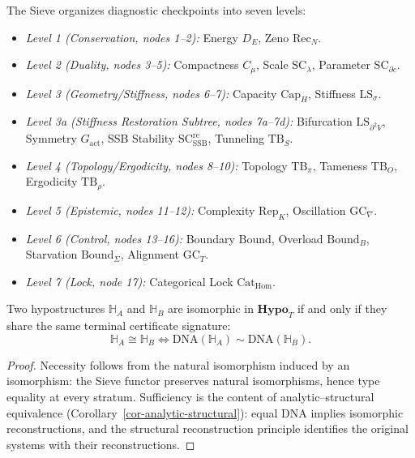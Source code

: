 \begin{definition}\label{def-twenty-one-strata}
The Sieve organizes diagnostic checkpoints into seven levels:
\begin{itemize}
\item \emph{Level 1 (Conservation, nodes 1--2):} Energy $D_E$, Zeno $\mathrm{Rec}_N$.
\item \emph{Level 2 (Duality, nodes 3--5):} Compactness $C_\mu$, Scale $\mathrm{SC}_\lambda$, Parameter $\mathrm{SC}_{\partial c}$.
\item \emph{Level 3 (Geometry/Stiffness, nodes 6--7):} Capacity $\mathrm{Cap}_H$, Stiffness $\mathrm{LS}_\sigma$.
\item \emph{Level 3a (Stiffness Restoration Subtree, nodes 7a--7d):} Bifurcation $\mathrm{LS}_{\partial^2 V}$, Symmetry $G_{\mathrm{act}}$, SSB Stability $\mathrm{SC}_{\mathrm{SSB}}^{\mathrm{re}}$, Tunneling $\mathrm{TB}_S$.
\item \emph{Level 4 (Topology/Ergodicity, nodes 8--10):} Topology $\mathrm{TB}_\pi$, Tameness $\mathrm{TB}_O$, Ergodicity $\mathrm{TB}_\rho$.
\item \emph{Level 5 (Epistemic, nodes 11--12):} Complexity $\mathrm{Rep}_K$, Oscillation $\mathrm{GC}_\nabla$.
\item \emph{Level 6 (Control, nodes 13--16):} Boundary $\mathrm{Bound}$, Overload $\mathrm{Bound}_B$, Starvation $\mathrm{Bound}_\Sigma$, Alignment $\mathrm{GC}_T$.
\item \emph{Level 7 (Lock, node 17):} Categorical Lock $\mathrm{Cat}_{\mathrm{Hom}}$.
\end{itemize}
\end{definition}

\begin{theorem}\label{thm-meta-identifiability}
Two hypostructures $\mathbb H_A$ and $\mathbb H_B$ are isomorphic in $\mathbf{Hypo}_T$ if and only if they share the same terminal certificate signature:
\[
\mathbb H_A \cong \mathbb H_B \iff \mathrm{DNA}(\mathbb H_A) \sim \mathrm{DNA}(\mathbb H_B).
\]
\end{theorem}

\begin{proof}
Necessity follows from the natural isomorphism induced by an isomorphism: the Sieve functor preserves natural isomorphisms, hence type equality at every stratum. Sufficiency is the content of analytic--structural equivalence (Corollary~\ref{cor-analytic-structural}): equal DNA implies isomorphic reconstructions, and the structural reconstruction principle identifies the original systems with their reconstructions.
\end{proof}

